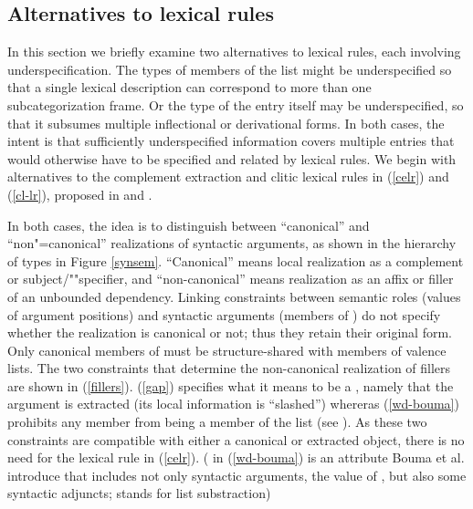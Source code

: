 \documentclass[output=paper
                ,modfonts
                ,nonflat
	        ,collection
	        ,collectionchapter
	        ,collectiontoclongg
 	        ,biblatex
                ,babelshorthands
                ,newtxmath
                ,draftmode
                ,colorlinks, citecolor=brown
]{./langsci/langscibook}
\begin{document}
{\subsection{Alternatives to lexical rules}
\label{sec:alt}

In this section we briefly examine two alternatives to lexical rules, each involving underspecification. The types of members of the  list might be underspecified so that a single lexical description can correspond to more than one subcategorization frame. Or the type of the entry itself may be underspecified, so that it subsumes multiple inflectional or derivational forms. In both cases, the intent is that sufficiently underspecified information covers multiple entries that would otherwise have to be specified and related by lexical rules. We begin with alternatives to the complement extraction and clitic lexical rules in (\ref{celr}) and (\ref{cl-lr}), proposed in  and . 
 

In both cases, the idea is to distinguish between ``canonical'' and ``non"=canonical''  realizations of syntactic arguments, as shown in the hierarchy of  types in Figure \ref{synsem}. ``Canonical'' means local realization as a complement or subject/""specifier, and ``non-canonical'' means realization as an affix or filler of an unbounded dependency. Linking constraints between semantic roles (values of argument positions)   and syntactic arguments (members of ) do not specify whether the realization is canonical or not; thus they retain their original form. Only canonical members of  must be structure-shared with members of valence lists. The two constraints that determine the non-canonical realization of fillers are shown in (\ref{fillers}). (\ref{gap}) specifies what it means to be a , namely that the argument is extracted (its local information is ``slashed'') whereras (\ref{wd-bouma}) prohibits any  member from being a member of the  list (see \citealt[23]{Boumaetal2001}). As these two constraints are compatible with either a canonical or extracted object, there is no need for the lexical rule in (\ref{celr}). ( in (\ref{wd-bouma}) is an attribute Bouma et al. introduce that includes not only syntactic arguments, the value of , but also some syntactic adjuncts; \- stands for list substraction)

}
\end{document}
